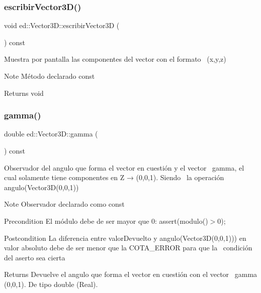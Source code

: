 \subsubsection{\texorpdfstring{escribir\+Vector3\+D()}{escribirVector3D()}}
{\footnotesize\ttfamily void ed\+::\+Vector3\+D\+::escribir\+Vector3D (\begin{DoxyParamCaption}{ }\end{DoxyParamCaption}) const}



Muestra por pantalla las componentes del vector con el formato~\newline
 (x,y,z) 

\begin{DoxyNote}{Note}
Método declarado const 
\end{DoxyNote}
\begin{DoxyReturn}{Returns}
void 
\end{DoxyReturn}
\mbox{\label{classed_1_1Vector3D_aeb55bfb591e508192eb11e63abbbac19}} 
\subsubsection{\texorpdfstring{gamma()}{gamma()}}
{\footnotesize\ttfamily double ed\+::\+Vector3\+D\+::gamma (\begin{DoxyParamCaption}{ }\end{DoxyParamCaption}) const}



Observador del angulo que forma el vector en cuestión y el vector~\newline
 gamma, el cual solamente tiene componentes en Z → (0,0,1). Siendo~\newline
 la operación angulo(\+Vector3\+D(0,0,1)) 

\begin{DoxyNote}{Note}
Observador declarado como const
\end{DoxyNote}
\begin{DoxyPrecond}{Precondition}
El módulo debe de ser mayor que 0\+: assert(modulo()$>$0);
\end{DoxyPrecond}
\begin{DoxyPostcond}{Postcondition}
La diferencia entre valor\+Devuelto y angulo(\+Vector3\+D(0,0,1))) en~\newline
 valor absoluto debe de ser menor que la C\+O\+T\+A\+\_\+\+E\+R\+R\+OR para que la~\newline
 condición del aserto sea cierta
\end{DoxyPostcond}
\begin{DoxyReturn}{Returns}
Devuelve el angulo que forma el vector en cuestión con el vector~\newline
 gamma (0,0,1). De tipo double (Real). 
\end{DoxyReturn}
\mbox{\label{classed_1_1Vector3D_ac96497e7c082fde19b4998408e4ec36b}} 
